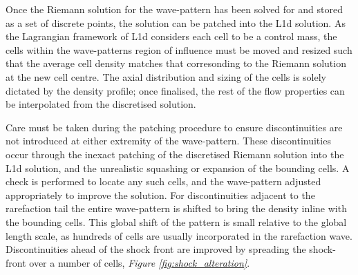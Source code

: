\documentclass[a4paper,10pt]{article}
\begin{document}
\par \medskip

Once the Riemann solution for the wave-pattern has been solved for and stored as a set of discrete points, the solution can be patched into the L1d solution.  As the Lagrangian framework of L1d considers each cell to be a control mass, the cells within the wave-patterns region of influence must be moved and resized such that the average cell density matches that corresonding to the Riemann solution at the new cell centre.  The axial distribution and sizing of the cells is solely dictated by the density profile; once finalised, the rest of the flow properties can be interpolated from the discretised solution.

\par \medskip

Care must be taken during the patching procedure to ensure discontinuities are not introduced at either extremity of the wave-pattern.  These discontinuities occur through the inexact patching of the discretised Riemann solution into the L1d solution, and the unrealistic squashing or expansion of the bounding cells.  A check is performed to locate any such cells, and the wave-pattern adjusted appropriately to improve the solution.  For discontinuities adjacent to the rarefaction tail the entire wave-pattern is shifted to bring the density inline with the bounding cells.  This global shift of the pattern is small relative to the global length scale, as hundreds of cells are usually incorporated in the rarefaction wave.  Discontinuities ahead of the shock front are improved by spreading the shock-front over a number of cells, \emph{Figure \ref{fig:shock_alteration}}.
\end{document}

